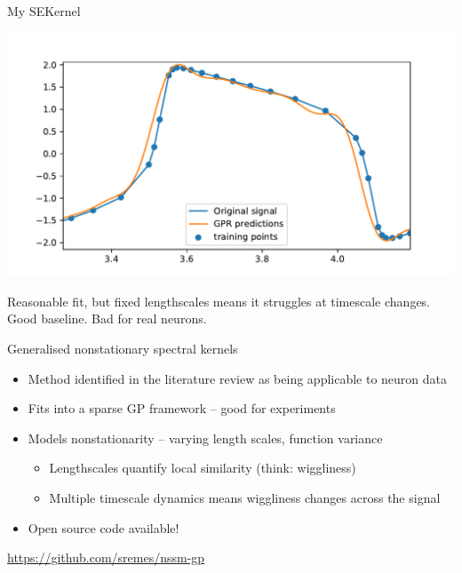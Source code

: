 \documentclass[presentation]{beamer}
\begin{document}
\begin{frame}[plain,label={sec:org16b230b}]{My SEKernel}
\begin{center}
\includegraphics[width=\textwidth]{./cosinekernel2.pdf}
\end{center}

\vfill
Reasonable fit, but fixed lengthscales means it struggles at timescale changes. Good baseline. Bad for real neurons.
\end{frame}

\begin{frame}[label={sec:org68c6498}]{Generalised nonstationary spectral kernels}
\begin{itemize}
\item Method identified in the literature review as being applicable to neuron data
\item Fits into a sparse GP framework -- good for experiments
\item Models nonstationarity -- varying length scales, function variance
\begin{itemize}
\item Lengthscales quantify local similarity (think: wiggliness)
\item Multiple timescale dynamics means wiggliness changes across the signal
\end{itemize}
\item Open source code available!
\end{itemize}

\vfill
\url{https://github.com/sremes/nssm-gp}
\end{frame}
\end{document}
